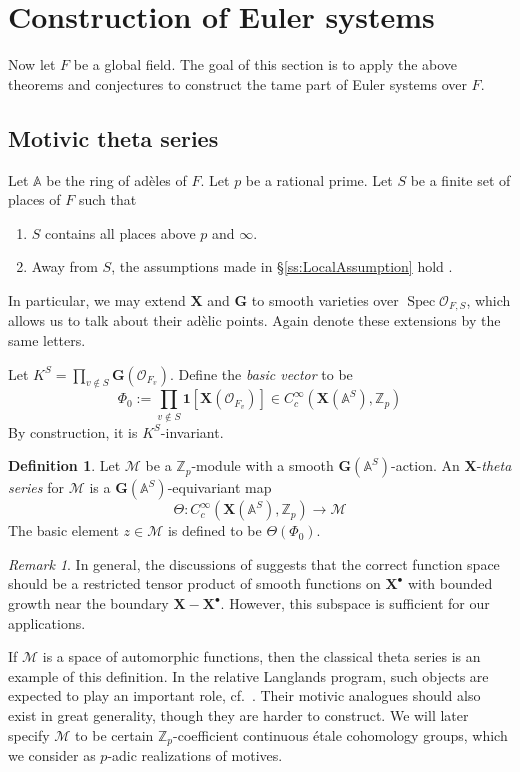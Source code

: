 \documentclass{amsart}
\theoremstyle{definition}
\newtheorem{definition}[theorem]{Definition}
\theoremstyle{remark}
\newtheorem{remark}[theorem]{Remark}
\newcommand{\1}{\mathbf{1}}
\newcommand{\A}{\mathbb{A}}
\newcommand{\mb}[1]{\mathbf{#1}}
\newcommand{\Or}{\mathcal{O}}
\newcommand{\sh}[1]{\mathcal{#1}}
\newcommand{\Z}{\mathbb{Z}}
\DeclareMathOperator{\spec}{Spec}
\theoremstyle{definition}
\newcommand{\bG}{\mathbf{G}}
\newcommand{\indf}{\mathbf{1}}
\begin{document}
\section{Construction of Euler systems}
Now let $F$ be a global field. The goal of this section is to apply the above theorems and conjectures to construct the tame part of Euler systems over $F$.

\subsection{Motivic theta series}
Let $\A$ be the ring of ad\`{e}les of $F$. Let $p$ be a rational prime. Let $S$ be a finite set of places of $F$ such that
\begin{enumerate}
  \item $S$ contains all places above $p$ and $\infty$.
  \item Away from $S$, the assumptions made in \S\ref{ss:LocalAssumption} hold \cite[Proposition 2.3.5]{SakANT}.
\end{enumerate}
In particular, we may extend $\mb{X}$ and $\mb{G}$ to smooth varieties over $\spec\Or_{F,S}$, which allows us to talk about their ad\`{e}lic points. Again denote these extensions by the same letters. 

Let $K^S=\prod_{v\notin S}\mb{G}(\Or_{F_v})$. Define the \emph{basic vector} to be
\[
  \Phi_0:=\prod_{v\notin S}\indf[\mb{X}(\Or_{F_v})]\in C_c^\infty(\mb{X}(\A^{S}),\Z_p)
\]
By construction, it is $K^S$-invariant.

\begin{definition}\label{defn:MotivicTheta}
  Let $\sh{M}$ be a $\Z_p$-module with a smooth $\bG(\A^S)$-action. An $\mb{X}$-\emph{theta series} for $\sh{M}$ is a $\bG(\A^S)$-equivariant map
  \[
    \Theta:C_c^\infty(\mb{X}(\A^S),\Z_p)\to\sh{M}
  \]
  The basic element $z\in\sh{M}$ is defined to be $\Theta(\Phi_0)$.
\end{definition}
\begin{remark}\label{rmk:FunctionSpace}
    In general, the discussions of \cite[\S 3]{SakANT} suggests that the correct function space should be a restricted tensor product of smooth functions on $\mb{X}^\bullet$ with bounded growth near the boundary $\mb{X}-\mb{X}^\bullet$. However, this subspace is sufficient for our applications.
\end{remark}

If $\sh{M}$ is a space of automorphic functions, then the classical theta series is an example of this definition. In the relative Langlands program, such objects are expected to play an important role, cf.~\cite[\S 15.1]{BZSV}. Their motivic analogues should also exist in great generality, though they are harder to construct. We will later specify $\sh{M}$ to be certain $\Z_p$-coefficient continuous \'etale cohomology groups, which we consider as $p$-adic realizations of motives.
\end{document}
